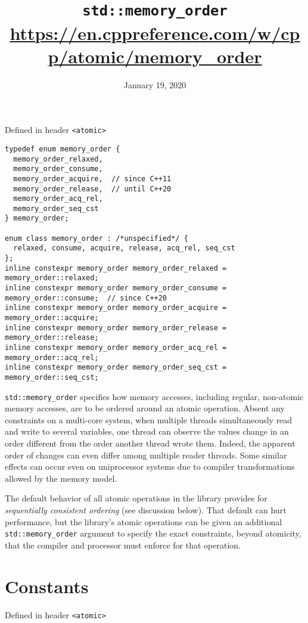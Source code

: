 \documentclass[a4paper,12pt,notitlepage,twoside,openright]{article}
\title{\texttt{std::memory\_order}\\{\footnotesize \url{https://en.cppreference.com/w/cpp/atomic/memory_order}}}
\author{}
\date{January 19, 2020}
\begin{document}
\maketitle

Defined in header \texttt{<atomic>}

\begin{verbatim}
typedef enum memory_order {
  memory_order_relaxed,
  memory_order_consume,
  memory_order_acquire,  // since C++11
  memory_order_release,  // until C++20
  memory_order_acq_rel,
  memory_order_seq_cst
} memory_order;

enum class memory_order : /*unspecified*/ {
  relaxed, consume, acquire, release, acq_rel, seq_cst
};
inline constexpr memory_order memory_order_relaxed = memory_order::relaxed;
inline constexpr memory_order memory_order_consume = memory_order::consume;  // since C++20
inline constexpr memory_order memory_order_acquire = memory_order::acquire;
inline constexpr memory_order memory_order_release = memory_order::release;
inline constexpr memory_order memory_order_acq_rel = memory_order::acq_rel;
inline constexpr memory_order memory_order_seq_cst = memory_order::seq_cst;
\end{verbatim}

\texttt{std::memory\_order} specifies how memory accesses, including regular, non-atomic memory accesses, are to be ordered around an atomic operation. Absent any constraints on a multi-core system, when multiple threads simultaneously read and write to several variables, one thread can observe the values change in an order different from the order another thread wrote them. Indeed, the apparent order of changes can even differ among multiple reader threads. Some similar effects can occur even on uniprocessor systems due to compiler transformations allowed by the memory model.

The default behavior of all atomic operations in the library provides for \emph{sequentially consistent ordering} (see discussion below). That default can hurt performance, but the library's atomic operations can be given an additional \texttt{std::memory\_order} argument to specify the exact constraints, beyond atomicity, that the compiler and processor must enforce for that operation.

\section{Constants}

Defined in header \texttt{<atomic>}
\end{document}
